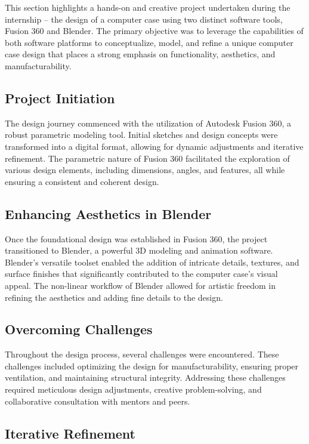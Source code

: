 This section highlights a hands-on and creative project undertaken during the internship – the design of a computer case using two distinct software tools, Fusion 360 and Blender. The primary objective was to leverage the capabilities of both software platforms to conceptualize, model, and refine a unique computer case design that places a strong emphasis on functionality, aesthetics, and manufacturability.

\subsection{Project Initiation}

The design journey commenced with the utilization of Autodesk Fusion 360, a robust parametric modeling tool. Initial sketches and design concepts were transformed into a digital format, allowing for dynamic adjustments and iterative refinement. The parametric nature of Fusion 360 facilitated the exploration of various design elements, including dimensions, angles, and features, all while ensuring a consistent and coherent design.

\subsection{Enhancing Aesthetics in Blender}

Once the foundational design was established in Fusion 360, the project transitioned to Blender, a powerful 3D modeling and animation software. Blender's versatile toolset enabled the addition of intricate details, textures, and surface finishes that significantly contributed to the computer case's visual appeal. The non-linear workflow of Blender allowed for artistic freedom in refining the aesthetics and adding fine details to the design.

\subsection{Overcoming Challenges}

Throughout the design process, several challenges were encountered. These challenges included optimizing the design for manufacturability, ensuring proper ventilation, and maintaining structural integrity. Addressing these challenges required meticulous design adjustments, creative problem-solving, and collaborative consultation with mentors and peers.

\subsection{Iterative Refinement}

